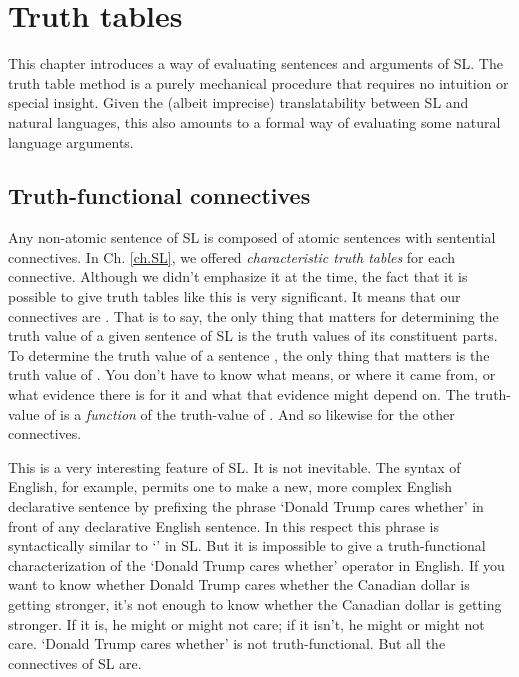 \chapter{Truth tables}
\label{ch.TruthTables}

This chapter introduces a way of evaluating sentences and arguments of SL. The truth table method is a purely mechanical procedure that requires no intuition or special insight. Given the (albeit imprecise) translatability between SL and natural languages, this also amounts to a formal way of evaluating some natural language arguments.

\section{Truth-functional connectives}

Any non-atomic sentence of SL is composed of atomic sentences with sentential connectives. In Ch. \ref{ch.SL}, we offered \emph{characteristic truth tables} for each connective. Although we didn't emphasize it at the time, the fact that it is possible to give truth tables like this is very significant. It means that our connectives are . That is to say, the only thing that matters for determining the truth value of a given sentence of SL is the truth values of its constituent parts. To determine the truth value of a sentence \enot\metaA{}, the only thing that matters is the truth value of \metaA{}. You don't have to know what \metaA{} means, or where it came from, or what evidence there is for it and what that evidence might depend on. The truth-value of \enot\metaA{} is a \emph{function} of the truth-value of \metaA{}. And so likewise for the other connectives.

This is a very interesting feature of SL. It is not inevitable. The syntax of English, for example, permits one to make a new, more complex English declarative sentence by prefixing the phrase `Donald Trump cares whether' in front of any declarative English sentence. In this respect this phrase is syntactically similar to `\enot' in SL. But it is impossible to give a truth-functional characterization of the `Donald Trump cares whether' operator in English. If you want to know whether Donald Trump cares whether  the Canadian dollar is getting stronger, it's not enough to know whether the Canadian dollar is getting stronger. If it is, he might or might not care; if it isn't, he might or might not care. `Donald Trump cares whether' is not truth-functional. But all the connectives of SL are.

